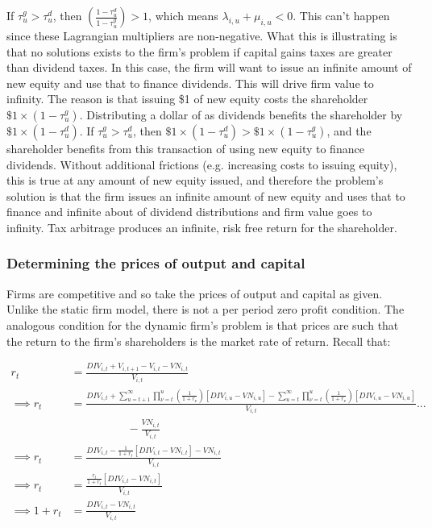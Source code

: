 \documentclass[letterpaper,12pt]{article}
\theoremstyle{definition}
\begin{document}
\begin{spacing}{1.5}
If $\tau^{g}_{u}> \tau^{d}_{u}$, then $ \left(\frac{1-\tau^{d}_{u}}{1-\tau^{g}_{u}}\right)>1$, which means  $ \lambda_{i,u} + \mu_{i,u} <0$.  This can't happen since these Lagrangian multipliers are non-negative.  What this is illustrating is that no solutions exists to the firm's problem if capital gains taxes are greater than dividend taxes.  In this case, the firm will want to issue an infinite amount of new equity and use that to finance dividends.  This will drive firm value to infinity.  The reason is that issuing \$1 of new equity costs the shareholder $\$1\times(1-\tau^{g}_{u})$.  Distributing a dollar of as dividends benefits the shareholder by $\$1\times (1-\tau^{d}_{u})$.  If $\tau^{g}_{u}> \tau^{d}_{u}$, then $\$1\times (1-\tau^{d}_{u}) > \$1\times(1-\tau^{g}_{u})$, and the shareholder benefits from this transaction of using new equity to finance dividends.  Without additional frictions (e.g. increasing costs to issuing equity), this is true at any amount of new equity issued, and therefore the problem's solution is that the firm issues an infinite amount of new equity and uses that to finance and infinite about of dividend distributions and firm value goes to infinity.  Tax arbitrage produces an infinite, risk free return for the shareholder.

\subsubsection*{Determining the prices of output and capital}

Firms are competitive and so take the prices of output and capital as given.  Unlike the static firm model, there is not a per period zero profit condition.  The analogous condition for the dynamic firm's problem is that prices are such that the return to the firm's shareholders is the market rate of return.  Recall that:

\begin{equation}
\begin{split}
r_{t} &= \frac{DIV_{i,t}+V_{i,t+1}-V_{i,t}-VN_{i,t}}{V_{i,t}}\\
\implies r_{t} &= \frac{DIV_{i,t} + \sum_{u=t+1}^{\infty}\prod_{\nu=t}^{u}\left(\frac{1}{1+r_{\nu}}\right)\left[DIV_{i,u}-VN_{i,u}\right] -\sum_{u=t}^{\infty}\prod_{\nu=t}^{u}\left(\frac{1}{1+r_{\nu}}\right)\left[DIV_{i,u}-VN_{i,u}\right]}{V_{i,t}} ...\\
& \quad\quad\quad\quad\quad - \frac{VN_{i,t}}{V_{i,t}} \\
\implies r_{t} & = \frac{DIV_{i,t} - \frac{1}{1+r_{t}}\left[DIV_{i,t} - VN_{i,t}\right] - VN_{i,t}}{V_{i,t}} \\
\implies r_{t} & = \frac{\frac{r_{t}}{1+r_{t}}\left[DIV_{i,t}-VN_{i,t}\right]}{V_{i,t}} \\
\implies 1+r_{t} &= \frac{DIV_{i,t}-VN_{i,t}}{V_{i,t}}
\end{split}
\end{equation}


\end{spacing}
\end{document}
